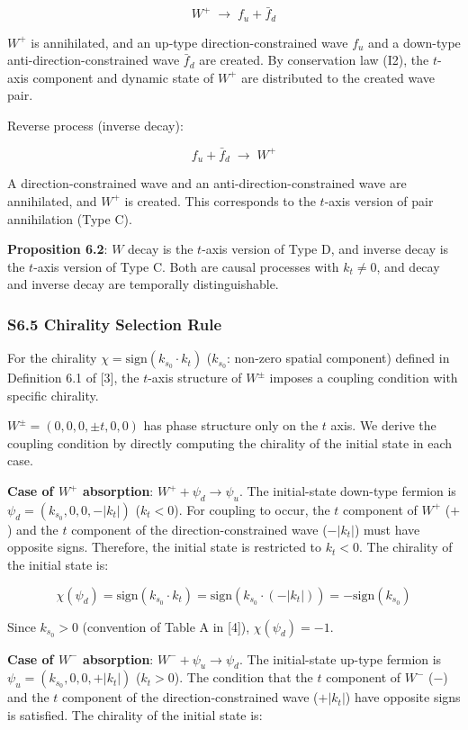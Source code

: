 \documentclass[
  a4paper,11pt]{article}
\theoremstyle{definition}
\theoremstyle{remark}
\begin{document}
\[W^+ \;\longrightarrow\; f_u + \bar{f}_d\]

\(W^+\) is annihilated, and an up-type direction-constrained wave
\(f_u\) and a down-type anti-direction-constrained wave \(\bar{f}_d\)
are created. By conservation law (I2), the \(t\)-axis component and
dynamic state of \(W^+\) are distributed to the created wave pair.

Reverse process (inverse decay):

\[f_u + \bar{f}_d \;\longrightarrow\; W^+\]

A direction-constrained wave and an anti-direction-constrained wave are
annihilated, and \(W^+\) is created. This corresponds to the \(t\)-axis
version of pair annihilation (Type C).

\textbf{Proposition 6.2}: \(W\) decay is the \(t\)-axis version of Type
D, and inverse decay is the \(t\)-axis version of Type C. Both are
causal processes with \(k_t \neq 0\), and decay and inverse decay are
temporally distinguishable.

\subsubsection{S6.5 Chirality Selection
Rule}\label{s6.5-chirality-selection-rule}

For the chirality \(\chi = \mathrm{sign}(k_{s_0} \cdot k_t)\)
(\(k_{s_0}\): non-zero spatial component) defined in Definition 6.1 of
{[}3{]}, the \(t\)-axis structure of \(W^{\pm}\) imposes a coupling
condition with specific chirality.

\(W^{\pm} = (0, 0, 0, \pm t, 0, 0)\) has phase structure only on the
\(t\) axis. We derive the coupling condition by directly computing the
chirality of the initial state in each case.

\textbf{Case of \(W^+\) absorption}: \(W^+ + \psi_d \to \psi_u\). The
initial-state down-type fermion is \(\psi_d = (k_{s_0}, 0, 0, -|k_t|)\)
(\(k_t < 0\)). For coupling to occur, the \(t\) component of \(W^+\)
(\(+\)) and the \(t\) component of the direction-constrained wave
(\(-|k_t|\)) must have opposite signs. Therefore, the initial state is
restricted to \(k_t < 0\). The chirality of the initial state is:

\[\chi(\psi_d) = \mathrm{sign}(k_{s_0} \cdot k_t) = \mathrm{sign}(k_{s_0} \cdot (-|k_t|)) = -\mathrm{sign}(k_{s_0})\]

Since \(k_{s_0} > 0\) (convention of Table A in {[}4{]}),
\(\chi(\psi_d) = -1\).

\textbf{Case of \(W^-\) absorption}: \(W^- + \psi_u \to \psi_d\). The
initial-state up-type fermion is \(\psi_u = (k_{s_0}, 0, 0, +|k_t|)\)
(\(k_t > 0\)). The condition that the \(t\) component of \(W^-\) (\(-\))
and the \(t\) component of the direction-constrained wave (\(+|k_t|\))
have opposite signs is satisfied. The chirality of the initial state is:
\end{document}

